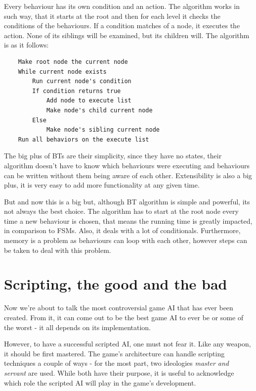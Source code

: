 \documentclass[a4paper, 12pt]{book}
\begin{document}
Every behaviour has its own condition and an action. The algorithm works in such way, that it starts at the root and then for each level it checks the conditions of the behaviours. If a condition matches of a node, it executes the action. None of its siblings will be examined, but its children will. The algorithm \cite{BehaviourSelectionAlgorithms} is as it follows:
\begin{verbatim}
    Make root node the current node
    While current node exists
        Run current node's condition
        If condition returns true
            Add node to execute list
            Make node's child current node
        Else
            Make node's sibling current node
    Run all behaviors on the execute list
\end{verbatim}

The big plus of BTs \cite{BehaviourSelectionAlgorithms} are their simplicity, since they have no states, their algorithm doesn't have to know which behaviours were executing and behaviours can be written without them being aware of each other. Extensibility is also a big plus, it is very easy to add more functionality at any given time.

But and now this is a big but, although BT algorithm is simple and powerful, its not always the best choice. The algorithm has to start at the root node every time a new behaviour is chosen, that means the running time is greatly impacted, in comparison to FSMs. Also, it deals with a lot of conditionals. Furthermore, memory is a problem as behaviours can loop with each other, however steps can be taken to deal with this problem.

\section{Scripting, the good and the bad}

Now we're about to talk the most controversial game AI that has ever been created. From it, it can come out to be the best game AI to ever be or some of the worst - it all depends on its implementation.

However, to have a successful scripted AI, one must not fear it. Like any weapon, it should be first mastered. 
The game's architecture can handle scripting techniques a couple of ways - for the most part, two ideologies \emph{master and servant} \cite{ForbiddenScripting} are used. While both have their purpose, it is useful to acknowledge which role the scripted AI will play in the game's development.
\end{document}
